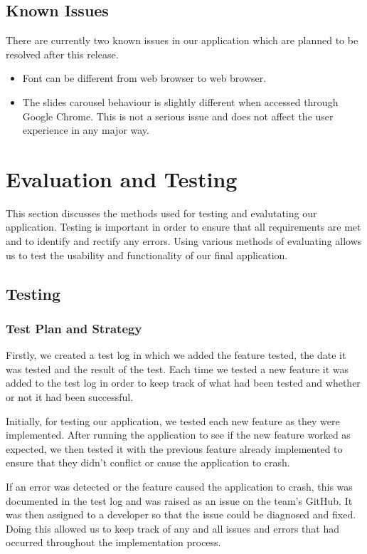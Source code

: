 \documentclass{l3proj}
\begin{document}
{\section{Known Issues}
There are currently two known issues in our application which are planned to be resolved after this release.\\
\begin{itemize}
\item Font can be different from web browser to web browser.
\item The slides carousel behaviour is slightly different when accessed through Google Chrome. This is not a serious issue and does not affect the user experience in any major way.
\end{itemize}

\chapter{Evaluation and Testing}
\label{evaluation}

This section discusses the methods used for testing and evalutating our application. Testing is important in order to ensure that all requirements are met and to identify and rectify any errors. Using various methods of evaluating allows us to test the usability and functionality of our final application.

\section{Testing}

\subsection{Test Plan and Strategy}

Firstly, we created a test log in which we added the feature tested, the date it was tested and the result of the test. Each time we tested a new feature it was added to the test log in order to keep track of what had been tested and whether or not it had been successful.

Initially, for testing our application, we tested each new feature as they were implemented. After running the application to see if the new feature worked as expected, we then tested it with the previous feature already implemented to ensure that they didn't conflict or cause the application to crash.

If an error was detected or the feature caused the application to crash, this was documented in the test log and was raised as an issue on the team's GitHub. It was then assigned to a developer so that the issue could be diagnosed and fixed. Doing this allowed us to keep track of any and all issues and errors that had occurred throughout the implementation process.

}
\end{document}
